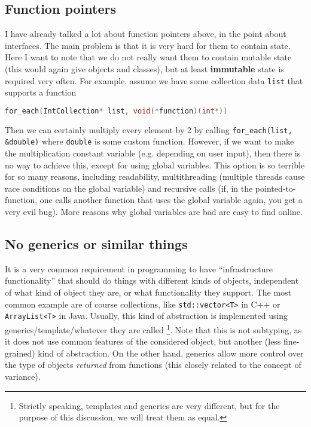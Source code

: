 \documentclass{scrartcl}
\begin{document}
\subsection{Function pointers}
I have already talked a lot about function pointers above, in the point about interfaces.
The main problem is that it is very hard for them to contain state.
Here I want to note that we do not really want them to contain mutable state (this would again give objects and classes), but at least \textbf{immutable} state is required very often.
For example, assume we have some collection data \lstinline{list} that supports a function
\begin{lstlisting}[language = c]
    for_each(IntCollection* list, void(*function)(int*))
\end{lstlisting}
Then we can certainly multiply every element by 2 by calling \lstinline{for_each(list, &double)} where \lstinline{double} is some custom function.
However, if we want to make the multiplication constant variable (e.g. depending on user input), then there is no way to achieve this, except for using global variables.
This option is so terrible for so many reasons, including readability, multithreading (multiple threads cause race conditions on the global variable) and recursive calls (if, in the pointed-to-function, one calls another function that uses the global variable again, you get a very evil bug). 
More reasons why global variables are bad are easy to find online.

\subsection{No generics or similar things}
It is a very common requirement in programming to have ``infrastructure functionality'' that should do things with different kinds of objects, independent of what kind of object they are, or what functionality they support.
The most common example are of course collections, like \lstinline{std::vector<T>} in C++ or \lstinline{ArrayList<T>} in Java.
Usually, this kind of abstraction is implemented using generics/template/whatever they are called
\footnote{Strictly speaking, templates and generics are very different, but for the purpose of this discussion, we will treat them as equal.}.
Note that this is not subtyping, as it does not use common features of the considered object, but another (less fine-grained) kind of abstraction.
On the other hand, generics allow more control over the type of objects \textit{returned} from functions (this closely related to the concept of variance).
\end{document}

